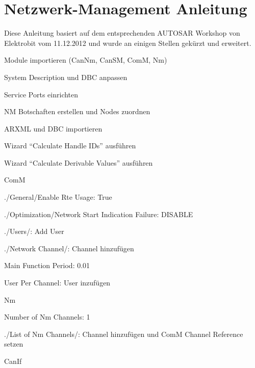 
\chapter{Netzwerk-Management Anleitung}
\label{sec:nm_tutorial}
Diese Anleitung basiert auf dem entsprechenden AUTOSAR Workshop von Elektrobit vom 11.12.2012 und wurde an einigen Stellen gekürzt und erweitert. \\

\begin{compactitem}
    \item Module importieren (CanNm, CanSM, ComM, Nm)
    \item System Description und DBC anpassen
    \begin{compactitem}
        \item Service Ports einrichten
        \item NM Botschaften erstellen und Nodes zuordnen
        \item ARXML und DBC importieren
        \item Wizard "`Calculate Handle IDs"' ausführen
        \item Wizard "`Calculate Derivable Values"' ausführen
    \end{compactitem}
    \item ComM
    \begin{compactitem}
        \item ./General/Enable Rte Usage: True
        \item ./Optimization/Network Start Indication Failure: DISABLE
        \item ./Users/: Add User
        \item ./Network Channel/: Channel hinzufügen
        \begin{compactitem}
            \item Main Function Period: 0.01
            \item User Per Channel: User inzufügen
        \end{compactitem}
    \end{compactitem}
    \item Nm
    \begin{compactitem}
        \item Number of Nm Channels: 1
        \item ./List of Nm Channels/: Channel hinzufügen und ComM Channel Reference setzen
    \end{compactitem}
    \item CanIf

\end{compactitem}
